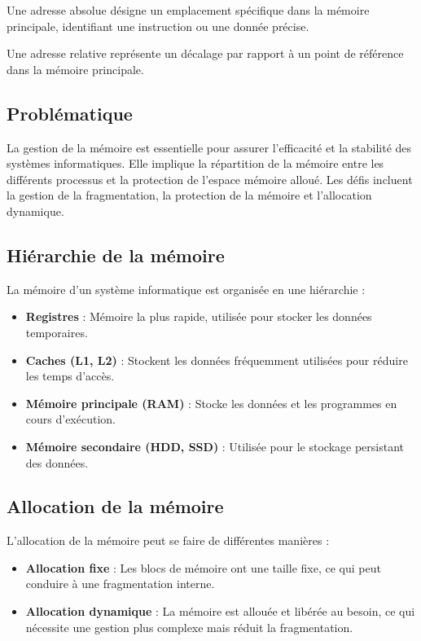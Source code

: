 Une adresse absolue désigne un emplacement spécifique dans la mémoire principale, identifiant une instruction ou une donnée précise.

Une adresse relative représente un décalage par rapport à un point de référence dans la mémoire principale.

\subsection{Problématique}
La gestion de la mémoire est essentielle pour assurer l'efficacité et la stabilité des systèmes informatiques. 
Elle implique la répartition de la mémoire entre les différents processus et la protection de l'espace mémoire alloué. 
Les défis incluent la gestion de la fragmentation, la protection de la mémoire et l'allocation dynamique.

\subsection{Hiérarchie de la mémoire}
La mémoire d'un système informatique est organisée en une hiérarchie :
\begin{itemize}
    \item \textbf{Registres} : Mémoire la plus rapide, utilisée pour stocker les données temporaires.
    \item \textbf{Caches (L1, L2)} : Stockent les données fréquemment utilisées pour réduire les temps d'accès.
    \item \textbf{Mémoire principale (RAM)} : Stocke les données et les programmes en cours d'exécution.
    \item \textbf{Mémoire secondaire (HDD, SSD)} : Utilisée pour le stockage persistant des données.
\end{itemize}

\subsection{Allocation de la mémoire}
L'allocation de la mémoire peut se faire de différentes manières :
\begin{itemize}
    \item \textbf{Allocation fixe} : Les blocs de mémoire ont une taille fixe, ce qui peut conduire à une fragmentation interne.
    \item \textbf{Allocation dynamique} : La mémoire est allouée et libérée au besoin, ce qui nécessite une gestion plus complexe mais réduit la fragmentation.
\end{itemize}

